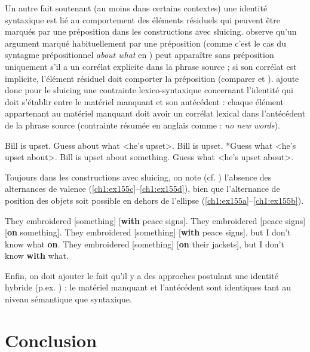 Un autre fait soutenant (au moins dans certains contextes) une identité syntaxique est lié au comportement des éléments résiduels qui peuvent être marqués par une préposition dans les constructions avec sluicing. \citet{Chung2005} observe qu’un argument marqué habituellement par une préposition (comme c’est le cas du syntagme prépositionnel \textit{about what} en ) peut apparaître sans préposition uniquement s’il a un corrélat explicite dans la phrase source  ; si son corrélat est implicite, l’élément résiduel doit comporter la préposition (comparer  et ). \citet{Chung2005} ajoute donc pour le sluicing une contrainte lexico-syntaxique concernant l’identité qui doit s’établir entre le matériel manquant et son antécédent : chaque élément appartenant au matériel manquant doit avoir un corrélat lexical dans l’antécédent de la phrase source (contrainte résumée en anglais comme : \textit{no new words}). 

\ea \label{ch1:ex154}
\ea  Bill is upset. Guess about what {\textless}he’s upset{\textgreater}. \label{ch1:ex154a} 
\ex  Bill is upset. *Guess what {\textless}he’s upset about{\textgreater}. \label{ch1:ex154b}
\ex  Bill is upset about something. Guess what {\textless}he’s upset about{\textgreater}. \label{ch1:ex154c} 
\z
\z

Toujours dans les constructions avec sluicing, on note (cf. \citealt{Merchant2013b}) l’absence des alternances de valence (\ref{ch1:ex155c}--\ref{ch1:ex155d}), bien que l’alter\-nance de position des objets soit possible en dehors de l’ellipse (\ref{ch1:ex155a}--\ref{ch1:ex155b}).

\ea
\ea  They embroidered [something] [\textbf{with} peace signs]. \citep[99]{Merchant2013b} \label{ch1:ex155a} 
\ex  They embroidered [peace signs] [\textbf{on} something]. \label{ch1:ex155b}
\ex  *They embroidered [something] [\textbf{with} peace signs], but I don’t know what \textbf{on}. \label{ch1:ex155c}
\ex  *They embroidered [something] [\textbf{on} their jackets], but I don’t know \textbf{with} what. \label{ch1:ex155d}
\z
\z

Enfin, on doit ajouter le fait qu’il y a des approches postulant une identité hybride (p.ex. \citealt{Kehler2002}) : le matériel manquant et l’antécédent sont identiques tant au niveau sémantique que syntaxique. 


\section{Conclusion}

